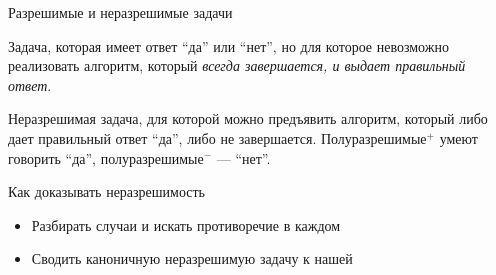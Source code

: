 \begin{frame}{Разрешимые и неразрешимые задачи}
  \begin{definition}
    Задача, которая имеет ответ ``да'' или ``нет'', но для которое невозможно реализовать алгоритм, который \emph{всегда завершается, и выдает правильный ответ}.
  \end{definition}
  \begin{definition}
    Неразрешимая задача, для которой можно предъявить алгоритм, который либо дает правильный ответ  ``да'', либо не завершается. Полуразрешимые$^{+}$ умеют говорить ``да'', полуразрешимые$^{-}$ --- ``нет''.
  \end{definition}
Как доказывать неразрешимость
\begin{itemize}
  \item Разбирать случаи и искать противоречие в каждом
  \item Сводить каноничную неразрешимую задачу к нашей
\end{itemize}
\end{frame}


